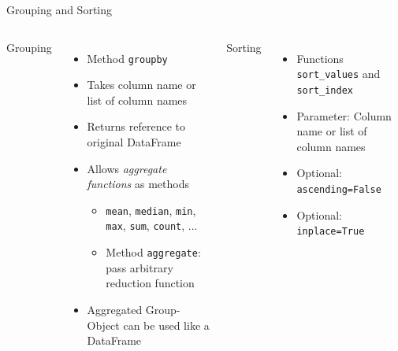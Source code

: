 \begin{frame}{Grouping and Sorting}
%
\begin{columns}[T]
Grouping
\begin{itemize}
\item Method \texttt{groupby}
\item Takes column name or list of column names
\item Returns reference to original DataFrame
\item Allows \emph{aggregate functions} as methods
	\begin{itemize}
	\item \texttt{mean}, \texttt{median}, \texttt{min}, \texttt{max}, \texttt{sum}, \texttt{count}, ...
	\item Method \texttt{aggregate}: pass arbitrary reduction function
	\end{itemize}
\item Aggregated Group-Object can be used like a DataFrame
\end{itemize}
%
Sorting
\begin{itemize}
\item Functions \texttt{sort\_values} and \texttt{sort\_index}
\item Parameter: Column name or list of column names
\item Optional: \texttt{ascending=False}
\item Optional: \texttt{inplace=True}
\end{itemize}
\end{columns}
%
\end{frame}


